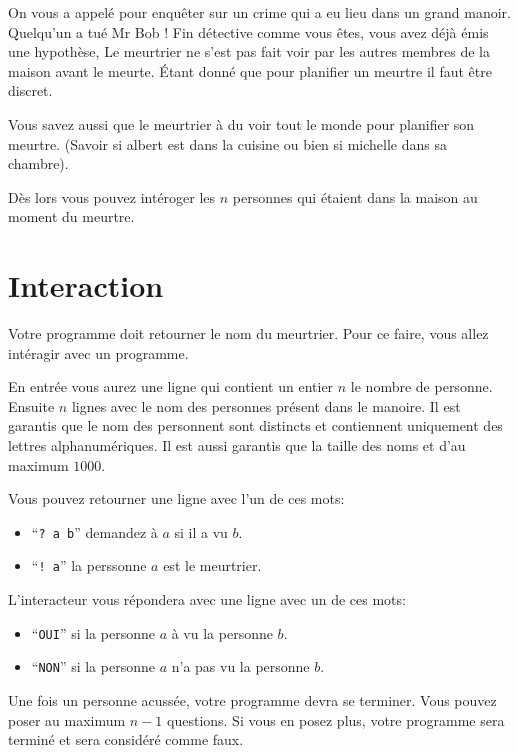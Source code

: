 \problemname{\problemyamlname}


\newcommand{\maxn}{10e4}  %

On vous a appelé pour enquêter sur un crime qui a eu lieu dans un grand manoir. Quelqu'un a tué Mr Bob ! Fin détective comme vous êtes, vous avez déjà émis une hypothèse,
Le meurtrier ne s'est pas fait voir par les autres membres de la maison avant le meurte. Étant donné que pour planifier un meurtre il faut être discret.

Vous savez aussi que le meurtrier à du voir tout le monde pour planifier son meurtre. (Savoir si albert est dans la cuisine ou bien si michelle dans sa chambre).

Dès lors vous pouvez intéroger les $n$ personnes qui étaient dans la maison au moment du meurtre. 


\section*{Interaction}
Votre programme doit retourner le nom du meurtrier. Pour ce faire, vous allez intéragir avec un programme.

En entrée vous aurez une ligne qui contient un entier $n$ le nombre de personne.
Ensuite $n$ lignes avec le nom des personnes présent dans le manoire. Il est garantis que le nom des personnent sont distincts et contiennent uniquement des lettres alphanumériques.
Il est aussi garantis que la taille des noms et d'au maximum $1000$.

Vous pouvez retourner une ligne avec l'un de ces mots:

\begin{itemize}
    \item ``\texttt{? a b}'' demandez à $a$ si il a vu $b$.
    \item ``\texttt{! a}'' la perssonne $a$ est le meurtrier.
\end{itemize}

L'interacteur vous répondera avec une ligne avec un de ces mots:
\begin{itemize}
    \item ``\texttt{OUI}'' si la personne $a$ à vu la personne $b$.
    \item ``\texttt{NON}'' si la personne $a$ n'a pas vu la personne $b$.
\end{itemize}

Une fois un personne acussée, votre programme devra se terminer.
Vous pouvez poser au maximum $n - 1$ questions. Si vous en posez plus, votre programme sera terminé et sera considéré comme faux. 
